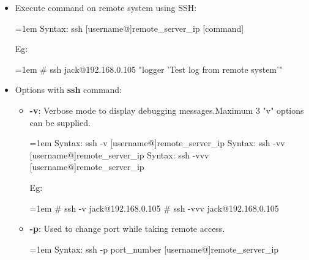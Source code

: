 \begin{flushleft}
\begin{itemize}
\begin{itemize}
	\end{itemize}
	\newpage
	
	\item Execute command on remote system using SSH:
		\begin{tcolorbox}[breakable,notitle,boxrule=0pt,colback=pink,colframe=pink]
		\color{black}
		\font=1em
		Syntax: ssh [username@]remote\_server\_ip [command]
		\font=4pt
	\end{tcolorbox}
	
	Eg:
	\begin{tcolorbox}[breakable,notitle,boxrule=-0pt,colback=black,colframe=black]
		\color{green}
		\font=1em
		\# ssh jack@192.168.0.105 "logger 'Test log from remote system'"
		\font=4pt
	\end{tcolorbox}
	\bigskip
	\bigskip
	
	\item Options with \textbf{ssh} command:
	\newline
	\begin{itemize}
		\item \textbf{-v}: Verbose mode to display debugging messages.Maximum 3 "v" options can be supplied.
		\begin{tcolorbox}[breakable,notitle,boxrule=0pt,colback=pink,colframe=pink]
			\color{black}
			\font=1em
			Syntax: ssh -v [username@]remote\_server\_ip
			\newline
			Syntax: ssh -vv [username@]remote\_server\_ip
			\newline
			Syntax: ssh -vvv [username@]remote\_server\_ip
			\font=4pt
		\end{tcolorbox}
		
		Eg:
		\begin{tcolorbox}[breakable,notitle,boxrule=-0pt,colback=black,colframe=black]
			\color{green}
			\font=1em
			\# ssh -v jack@192.168.0.105
			\newline
			\# ssh -vvv jack@192.168.0.105
			\font=4pt
		\end{tcolorbox}
		\bigskip
		\bigskip
		\item \textbf{-p}: Used to change port while taking remote access.
		\begin{tcolorbox}[breakable,notitle,boxrule=0pt,colback=pink,colframe=pink]
			\color{black}
			\font=1em
			Syntax: ssh -p port\_number [username@]remote\_server\_ip
			\font=4pt
		\end{tcolorbox}
		

\end{itemize}
\end{itemize}
\end{flushleft}
